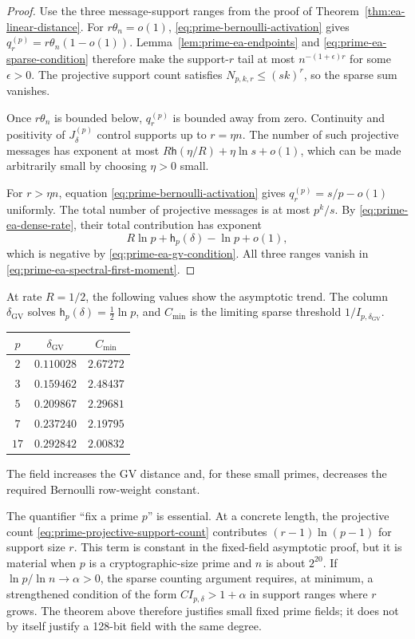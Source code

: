 \begin{proof}
Use the three message-support ranges from the proof of
Theorem~\ref{thm:ea-linear-distance}.  For $r\theta_n=o(1)$,
\eqref{eq:prime-bernoulli-activation} gives
$q^{(p)}_r=r\theta_n(1-o(1))$.  Lemma~\ref{lem:prime-ea-endpoints} and
\eqref{eq:prime-ea-sparse-condition} therefore make the support-$r$ tail at
most $n^{-(1+\epsilon)r}$ for some $\epsilon>0$.  The projective support count
satisfies $N_{p,k,r}\leq(sk)^r$, so the sparse sum vanishes.

Once $r\theta_n$ is bounded below, $q^{(p)}_r$ is bounded away from zero.
Continuity and positivity of $J^{(p)}_\delta$ control supports up to
$r=\eta n$.  The number of such projective messages has exponent at most
$R\mathsf h(\eta/R)+\eta\ln s+o(1)$, which can be made arbitrarily small by
choosing $\eta>0$ small.

For $r>\eta n$, equation \eqref{eq:prime-bernoulli-activation} gives
$q^{(p)}_r=s/p-o(1)$ uniformly.  The total number of projective messages is at
most $p^k/s$.  By \eqref{eq:prime-ea-dense-rate}, their total contribution has
exponent
\[
 R\ln p+\mathsf h_p(\delta)-\ln p+o(1),
\]
which is negative by \eqref{eq:prime-ea-gv-condition}.  All three ranges
vanish in \eqref{eq:prime-ea-spectral-first-moment}.
\end{proof}

At rate $R=1/2$, the following values show the asymptotic trend.  The column
$\delta_{\mathrm{GV}}$ solves
$\mathsf h_p(\delta)=\tfrac12\ln p$, and $C_{\min}$ is the limiting sparse
threshold $1/I_{p,\delta_{\mathrm{GV}}}$.
\begin{center}
\begin{tabular}{c|cc}
 $p$&$\delta_{\mathrm{GV}}$&$C_{\min}$\\\hline
 $2$&$0.110028$&$2.67272$\\
 $3$&$0.159462$&$2.48437$\\
 $5$&$0.209867$&$2.29681$\\
 $7$&$0.237240$&$2.19795$\\
 $17$&$0.292842$&$2.00832$
\end{tabular}
\end{center}
The field increases the GV distance and, for these small primes, decreases the
required Bernoulli row-weight constant.

The quantifier ``fix a prime $p$'' is essential.  At a concrete length, the
projective count \eqref{eq:prime-projective-support-count} contributes
$(r-1)\ln(p-1)$ for support size $r$.  This term is constant in the
fixed-field asymptotic proof, but it is material when $p$ is a
cryptographic-size prime and $n$ is about $2^{20}$.  If
$\ln p/\ln n\to\alpha>0$, the sparse counting argument requires, at minimum,
a strengthened condition of the form $C I_{p,\delta}>1+\alpha$ in support
ranges where $r$ grows.  The theorem above therefore justifies small fixed
prime fields; it does not by itself justify a 128-bit field with the same
degree.

